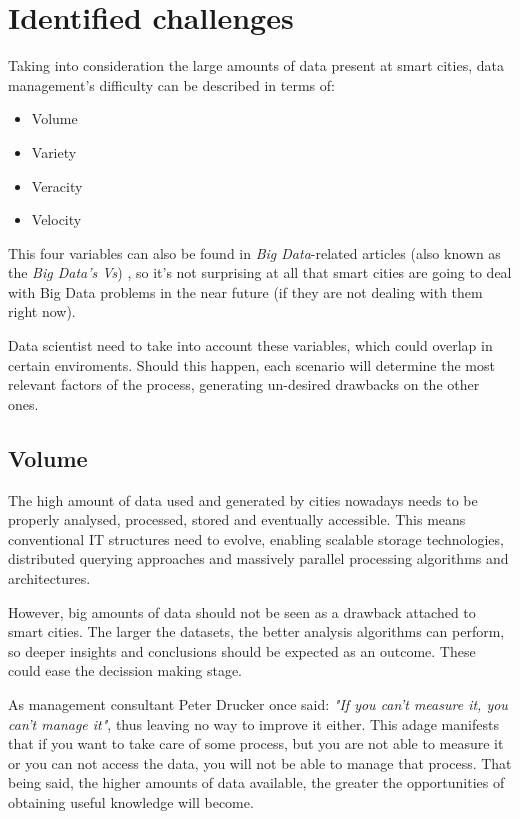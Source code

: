 \section{Identified challenges}

Taking into consideration the large amounts of data present at smart cities, data management's difficulty can be described in terms of:
\begin{itemize}
	\item Volume
	\item Variety
	\item Veracity
	\item Velocity
\end{itemize}

This four variables can also be found in \textit{Big Data}-related articles (also known as the \textit{Big Data's Vs}) \cite{zikopoulos2011understanding,russom2011big}, so it's not surprising at all that smart cities are going to deal with Big Data problems in the near future (if they are not dealing with them right now).

Data scientist need to take into account these variables, which could overlap in certain enviroments. Should this happen, each scenario will determine the most relevant factors of the process, generating un-desired drawbacks on the other ones.

\subsection{Volume}

The high amount of data used and generated by cities nowadays needs to be properly analysed, processed, stored and eventually accessible. This means conventional IT structures need to evolve, enabling scalable storage technologies, distributed querying approaches and massively parallel processing algorithms and architectures.


However, big amounts of data should not be seen as a drawback attached to smart cities. The larger the datasets, the better analysis algorithms can perform, so deeper insights and conclusions should be expected as an outcome. These could ease the decission making stage.

As management consultant Peter Drucker once said: \textit{"If you can't measure it, you can't manage it"}, thus leaving no way to improve it either. This adage manifests that if you want to take care of some process, but you are not able to measure it or you can not access the data, you will not be able to manage that process. That being said, the higher amounts of data available, the greater the opportunities of obtaining useful knowledge will become.

